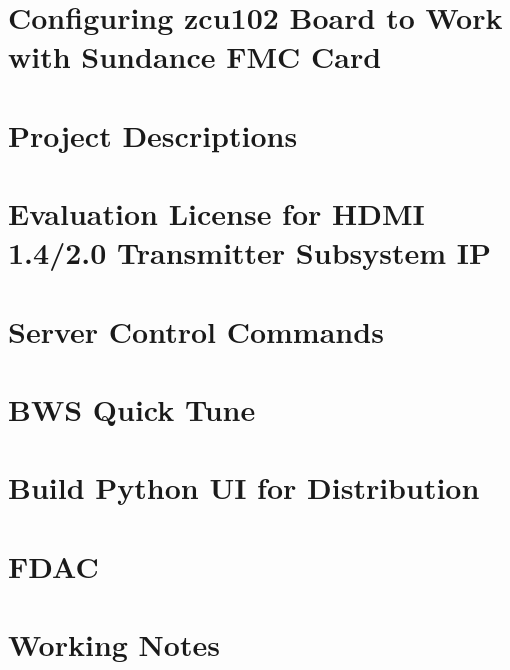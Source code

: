 \documentclass[10pt,a4paper]{article}
\begin{document}
%		
		
	\section{Configuring zcu102 Board to Work with Sundance FMC Card}
	\label{sec:config_zcu102_for_sundance}
		
	
	\section{Project Descriptions}
	\label{sec:proj_descript}
		
	
	\section{Evaluation License for HDMI 1.4/2.0 Transmitter Subsystem IP}
	\label{sec:eval_license_hdim_tx_ss}
		
	
	\section{Server Control Commands}
	\label{sec:serv_ctrl_cmds}
		
	
	\section{BWS Quick Tune}
	\label{sec:bws_quick_tune}
		
	
	\section{Build Python UI for Distribution}
	\label{sec:build_python_ui_for_dist}
		
	
	\section{FDAC}
	\label{sec:fdac}
		
		
	\newpage	
	
	\section{Working Notes}
	\label{sec:working_notes}
		
		
\end{document}
